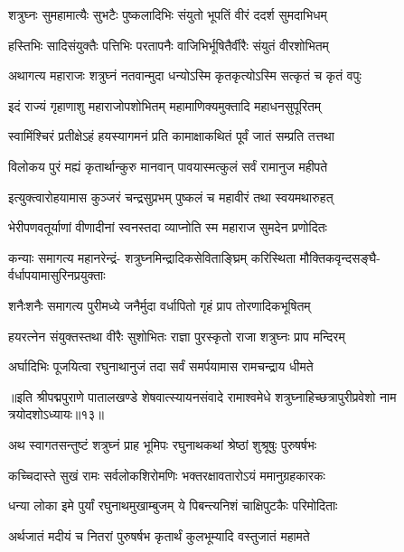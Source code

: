 \twolineshloka
{शत्रुघ्नः सुमहामात्यैः सुभटैः पुष्कलादिभिः}
{संयुतो भूपतिं वीरं ददर्श सुमदाभिधम्}%

\twolineshloka
{हस्तिभिः सादिसंयुक्तैः पत्तिभिः परतापनैः}
{वाजिभिर्भूषितैर्वीरैः संयुतं वीरशोभितम्}%

\twolineshloka
{अथागत्य महाराजः शत्रुघ्नं नतवान्मुदा}
{धन्योऽस्मि कृतकृत्योऽस्मि सत्कृतं च कृतं वपुः}%

\twolineshloka
{इदं राज्यं गृहाणाशु महाराजोपशोभितम्}
{महामाणिक्यमुक्तादि महाधनसुपूरितम्}%

\twolineshloka
{स्वामिंश्चिरं प्रतीक्षेऽहं हयस्यागमनं प्रति}
{कामाक्षाकथितं पूर्वं जातं सम्प्रति तत्तथा}%

\twolineshloka
{विलोकय पुरं मह्यं कृतार्थान्कुरु मानवान्}
{पावयास्मत्कुलं सर्वं रामानुज महीपते}%

\twolineshloka
{इत्युक्त्वारोहयामास कुञ्जरं चन्द्रसुप्रभम्}
{पुष्कलं च महावीरं तथा स्वयमथारुहत्}%

\twolineshloka
{भेरीपणवतूर्याणां वीणादीनां स्वनस्तदा}
{व्याप्नोति स्म महाराज सुमदेन प्रणोदितः}%

\fourlineindentedshloka
{कन्याः समागत्य महानरेन्द्रं-}
{शत्रुघ्नमिन्द्रादिकसेविताङ्घ्रिम्}
{करिस्थिता मौक्तिकवृन्दसङ्घै-}
{र्वर्धापयामासुरिनप्रयुक्ताः}%

\twolineshloka
{शनैःशनैः समागत्य पुरीमध्ये जनैर्मुदा}
{वर्धापितो गृहं प्राप तोरणादिकभूषितम्}%

\twolineshloka
{हयरत्नेन संयुक्तस्तथा वीरैः सुशोभितः}
{राज्ञा पुरस्कृतो राजा शत्रुघ्नः प्राप मन्दिरम्}%

\twolineshloka
{अर्घादिभिः पूजयित्वा रघुनाथानुजं तदा}
{सर्वं समर्पयामास रामचन्द्राय धीमते}%

{॥इति श्रीपद्मपुराणे पातालखण्डे शेषवात्स्यायनसंवादे रामाश्वमेधे शत्रुघ्नाहिच्छत्रापुरीप्रवेशो नाम त्रयोदशोऽध्यायः॥१३॥}

\resetShloka


\twolineshloka
{अथ स्वागतसन्तुष्टं शत्रुघ्नं प्राह भूमिपः}
{रघुनाथकथां श्रेष्ठां शुश्रूषुः पुरुषर्षभः}%


\twolineshloka
{कच्चिदास्ते सुखं रामः सर्वलोकशिरोमणिः}
{भक्तरक्षावतारोऽयं ममानुग्रहकारकः}%

\twolineshloka
{धन्या लोका इमे पुर्यां रघुनाथमुखाम्बुजम्}
{ये पिबन्त्यनिशं चाक्षिपुटकैः परिमोदिताः}%

\twolineshloka
{अर्थजातं मदीयं च नितरां पुरुषर्षभ}
{कृतार्थं कुलभूम्यादि वस्तुजातं महामते}%

